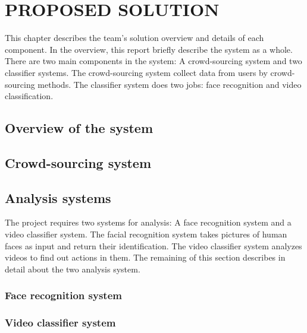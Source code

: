 \chapter{PROPOSED SOLUTION}
\label{chap:caseMedical}

This chapter describes the team's solution overview and details of each component. In the overview, this report briefly describe the system as a whole. There are two main components in the system: A crowd-sourcing system and two classifier systems. The crowd-sourcing system collect data from users by crowd-sourcing methods. The classifier system does two jobs:  face recognition and video classification.
\section{Overview of the system}
\section{Crowd-sourcing system}
\section{Analysis systems}
The project requires two systems for analysis: A face recognition system and a video classifier system. The facial recognition system takes pictures of human faces as input and return their identification. The video classifier system analyzes videos to find out actions in them. The remaining of this section describes in detail about the two analysis system.
\subsection{Face recognition system}

\subsection{Video classifier system}
